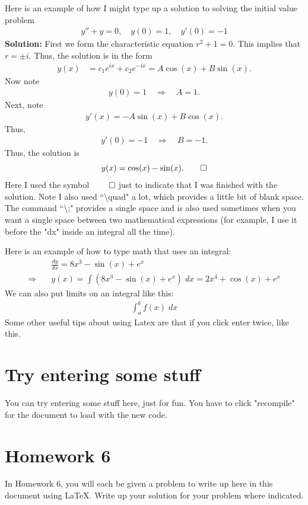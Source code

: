 \documentclass{article}
\begin{document}
Here is an example of how I might type up a solution to solving the initial value problem
\begin{align*}
    y'' + y = 0, \quad y(0) = 1, \quad y'(0) = -1
\end{align*}
\textbf{Solution:} \quad First we form the characteristic equation $r^2 + 1 = 0$. This implies that $r = \pm i$. Thus, the solution is in the form
\begin{align*}
    y(x) &= c_1 e^{ix} + c_2e^{-ix} = A \cos(x) + B \sin(x).
\end{align*}
Now note
\begin{align*}
    y(0) = 1 \quad \Rightarrow \quad A = 1.
\end{align*}
Next, note
\begin{align*}
    y'(x) = -A \sin(x) + B \cos(x).
\end{align*}
Thus, 
\begin{align*}
    y'(0) = -1 \quad \Rightarrow \quad B = -1.
\end{align*}
Thus, the solution is
\begin{align*}
    y(x) = \cos(x) - \sin(x). \qed
\end{align*} 
Here I used the symbol $\qed$ \quad just to indicate that I was finished with the solution. Note I also used ``\textbackslash quad" a lot, which provides a little bit of blank space. The command ``\textbackslash ;" provides a single space and is also used sometimes when you want a single space between two mathematical expressions (for example, I use it before the "dx" inside an integral all the time).

Here is an example of how to type math that uses an integral:
\begin{align*}
    & \frac{dy}{dx} = 8x^3 - \sin(x) + e^x \\
    \Rightarrow \quad & y(x) = \int \left(8x^3 - \sin(x) + e^x\right) \; dx = 2x^4 + \cos(x) + e^x
\end{align*}
We can also put limits on an integral like this:
\begin{align*}
    \int_a^b f(x) \; dx
\end{align*}
Some other useful tips about using Latex are that if you click enter twice, like this.

\section{Try entering some stuff}
You can try entering some stuff here, just for fun. You have to click "recompile" for the document to load with the new code.
\newpage
\section{Homework 6}
In Homework 6, you will each be given a problem to write up here in this document using LaTeX. Write up your solution for your problem where indicated.
\end{document}
